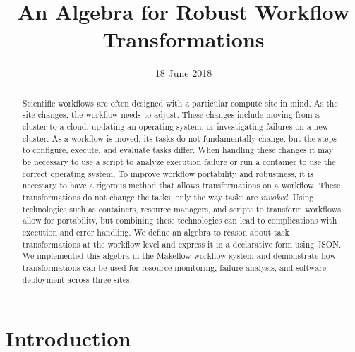 \documentclass[conference]{IEEEtran}
\begin{document}
\title{An Algebra for Robust Workflow Transformations}



\author{
\and
{}
}

\date{18 June 2018}


\maketitle

\begin{abstract}
Scientific workflows 
are often designed with a
particular compute site in mind.
As the site changes,
the workflow needs to adjust.
These changes include 
moving from a cluster to a cloud,
updating an operating system,
or investigating failures on a new cluster.
As a workflow is moved, 
its tasks do not fundamentally change,
but the steps to configure, 
execute, and evaluate tasks differ.
When handling these changes it may be necessary
to use a script to analyze execution failure or
run a container to use the correct operating system.
To improve workflow portability and robustness,
it is necessary to have
a rigorous method that allows transformations on a workflow.
These transformations do not change the tasks, 
only the way tasks are \emph{invoked}.
Using technologies such as containers, resource managers, and scripts 
to transform workflows allow for portability,
but combining these technologies
can lead to complications with execution and error
handling.
We define an algebra to reason about task transformations 
at the workflow level and express it
in a declarative form using JSON.
We implemented this algebra in the
Makeflow workflow system and demonstrate
how transformations can be used for 
resource monitoring, failure analysis, and software deployment across three sites.
\end{abstract}



\section{Introduction}
\end{document}
